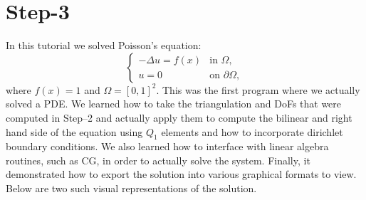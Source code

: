 \documentclass[11pt,fullpage]{article}
\newcommand{\lap}{\Delta}
\theoremstyle{lemma}
\theoremstyle{definition}
\theoremstyle{lemma}
\begin{document}
\section*{Step-3}
In this tutorial we solved Poisson's equation:
$$
\begin{cases}
-\lap u = f(x) &\text{in }\Omega,\\
u = 0 & \text{on }\partial\Omega,
\end{cases}
$$
where $f(x) = 1$ and $\Omega = [0,1]^2$. This was the first program where we actually solved a PDE. We learned how to take the triangulation and DoFs that were computed in Step--2 and actually apply them to compute the bilinear and right hand side of the equation using $Q_1$ elements and how to incorporate dirichlet boundary conditions. We also learned how to interface with linear algebra routines, such as CG, in order to actually solve the system. Finally, it demonstrated how to export the solution into various graphical formats to view. Below are two such visual representations of the solution.
\end{document}
